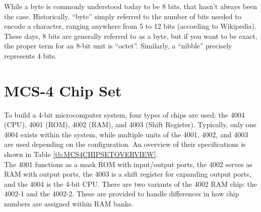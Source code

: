 While a byte is commonly understood today to be 8 bits, that hasn't always been the case. Historically, ``byte'' simply referred to the number of bits needed to encode a character, ranging anywhere from 5 to 12 bits (according to Wikipedia). These days, 8 bits are generally referred to as a byte, but if you want to be exact, the proper term for an 8-bit unit is ``octet''. Similarly, a ``nibble'' precisely represents 4 bits.

\section{MCS-4 Chip Set}
To build a 4-bit microcomputer system, four types of chips are used: the 4004 (CPU), 4001 (ROM), 4002 (RAM), and 4003 (Shift Register). Typically, only one 4004 exists within the system, while multiple units of the 4001, 4002, and 4003 are used depending on the configuration. An overview of their specifications is shown in Table \ref{tb:MCS4CHIPSETOVERVIEW}.\\

The 4001 functions as a mask ROM with input/output ports, the 4002 serves as RAM with output ports, the 4003 is a shift register for expanding output ports, and the 4004 is the 4-bit CPU. There are two variants of the 4002 RAM chip: the 4002-1 and the 4002-2. These are provided to handle differences in how chip numbers are assigned within RAM banks.


